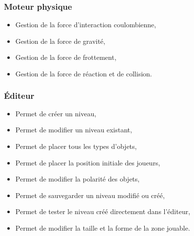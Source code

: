 \subsubsection{Moteur physique}

\begin{itemize}
    \item Gestion de la force d'interaction coulombienne,
    \item Gestion de la force de gravité,
    \item Gestion de la force de frottement,
    \item Gestion de la force de réaction et de collision.
\end{itemize}



\subsubsection {Éditeur}

\begin {itemize}
    \item Permet de créer un niveau,
    \item Permet de modifier un niveau existant,
    \item Permet de placer tous les types d'objets,
    \item Permet de placer la position initiale des joueurs,
    \item Permet de modifier la polarité des objets,
    \item Permet de sauvegarder un niveau modifié ou créé,
    \item Permet de tester le niveau créé directement dans l'éditeur,
    \item Permet de modifier la taille et la forme de la zone jouable.
\end {itemize}
